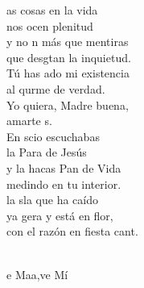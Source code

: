 \begin{cancion}%
	as cosas en la vida\\
	nos ocen plenitud\\
	y no n más que mentiras\\
	que desgtan la inquietud.\\
	Tú has ado mi existencia\\
	al qurme de verdad.\\
	Yo quiera, Madre buena,\\
	amarte s.	\\
	En scio escuchabas\\
	la Para de Jesús\\
	y la hacas Pan de Vida\\
	medindo en tu interior.\\
	la sla que ha caído\\
	ya gera y está en flor,\\
	con el razón en fiesta cant. \\\jump\\
	\begin{chorus}%
	e Maa,ve Mí\\
	\end{chorus}%
	\jump\\
\end{cancion}%
